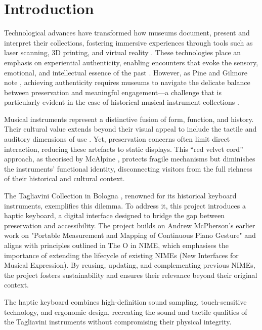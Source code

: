 \section{Introduction}\label{introduction}

Technological advances have transformed how museums document, present and interpret their collections, fostering immersive experiences through tools such as laser scanning, 3D printing, and virtual reality \cite{allard2005use,Wachowiak01082009,RCM_2024_3D,Kuzminsky_LaserScan_2012,Schaich_3D_2007}. These technologies place an emphasis on experiential authenticity, enabling encounters that evoke the sensory, emotional, and intellectual essence of the past \cite{trant_Auth_1999}. However, as Pine and Gilmore note \cite{pinegilmore_2007}, achieving authenticity requires museums to navigate the delicate balance between preservation and meaningful engagement—a challenge that is particularly evident in the case of historical musical instrument collections \cite{McAlpine2014}.

Musical instruments represent a distinctive fusion of form, function, and history. Their cultural value extends beyond their visual appeal to include the tactile and auditory dimensions of use \cite{Fritz2017}. Yet, preservation concerns often limit direct interaction, reducing these artefacts to static displays. This ``red velvet cord'' approach, as theorised by McAlpine \cite{McAlpine2014}, protects fragile mechanisms but diminishes the instruments’ functional identity, disconnecting visitors from the full richness of their historical and cultural context.

The Tagliavini Collection in Bologna \cite{Tagliavini2007}, renowned for its historical keyboard instruments, exemplifies this dilemma. To address it, this project introduces a haptic keyboard, a digital interface designed to bridge the gap between preservation and accessibility. The project builds on Andrew McPherson’s earlier work on "Portable Measurement and Mapping of Continuous Piano Gesture" and aligns with principles outlined in The O in NIME, which emphasises the importance of extending the lifecycle of existing NIMEs (New Interfaces for Musical Expression). By reusing, updating, and complementing previous NIMEs, the project fosters sustainability and ensures their relevance beyond their original context. 

The haptic keyboard combines high-definition sound sampling, touch-sensitive technology, and ergonomic design, recreating the sound and tactile qualities of the Tagliavini instruments without compromising their physical integrity. 


